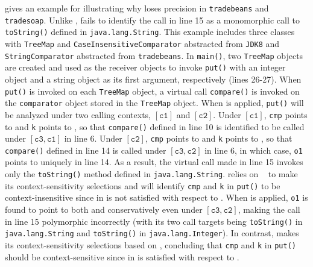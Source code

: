  gives an example for illustrating why  loses 
precision in \texttt{tradebeans} and \texttt{tradesoap}. Unlike 
,
fails to
identify the call in line 15 as a monomorphic call to 
\texttt{toString()} defined in \texttt{java.lang.String}. 
This example includes three classes with \texttt{TreeMap} and  \linebreak
\texttt{CaseInsensitiveComparator} abstracted from \texttt{JDK8} and 
\texttt{StringComparator} abstracted from  \linebreak \texttt{tradebeans}. 
In \texttt{main()}, two \texttt{TreeMap} objects are created and used as the receiver objects to 
invoke \texttt{put()} 
with an integer object and a string object as its first argument, 
respectively (lines 26-27). When \texttt{put()} is invoked on each
\texttt{TreeMap} object,
a virtual call \texttt{compare()} is invoked on the 
 \texttt{comparator} object stored in the \texttt{TreeMap} object. 
When  is applied, \texttt{put()} will be analyzed under two  calling contexts, 
$[\mathtt{c1}]$ and $[\mathtt{c2}]$.
Under $[\mathtt{c1}]$,
\texttt{cmp} points to   and  \texttt{k} points to , 
so that \texttt{compare()} defined in line 10 is identified to be called under 
$[\mathtt{c3}, \mathtt{c1}]$
in line 6. Under $[\mathtt{c2}]$,  \texttt{cmp} 
points to  and  \texttt{k} points to ,
so that \texttt{compare()} defined in line 14 is called under
$[\mathtt{c3}, \mathtt{c2}]$
in line 6, in which case, 
 \texttt{o1} points to  uniquely in line 14. 
 As a result, the virtual call made in line 15 invokes only the \texttt{toString()} method defined in \texttt{java.lang.String}. 
 \selectx relies on  \manuLFC~\cite{sridharan2006refinement}
 to make its
context-sensitivity selections and will identify \texttt{cmp} and \texttt{k} in \texttt{put()} to be context-insensitive since \selconThree in  is not satisfied with respect to \manuLFC.  When
 is applied,
\texttt{o1} is found to
point to both  and   conservatively
even under  $[\mathtt{c3}, \mathtt{c2}]$, making the call in line 15 polymorphic 
incorrectly
(with its two call targets being \texttt{toString()} in 
\texttt{java.lang.String} and \texttt{toString()} in 
\texttt{java.lang.Integer}). In contrast, \tool makes its context-sensitivity selections based on  \LFCR, concluding that \texttt{cmp} and \texttt{k} in \texttt{put()} should be context-sensitive since \selconThree in  is satisfied with respect to \LFCR. 
